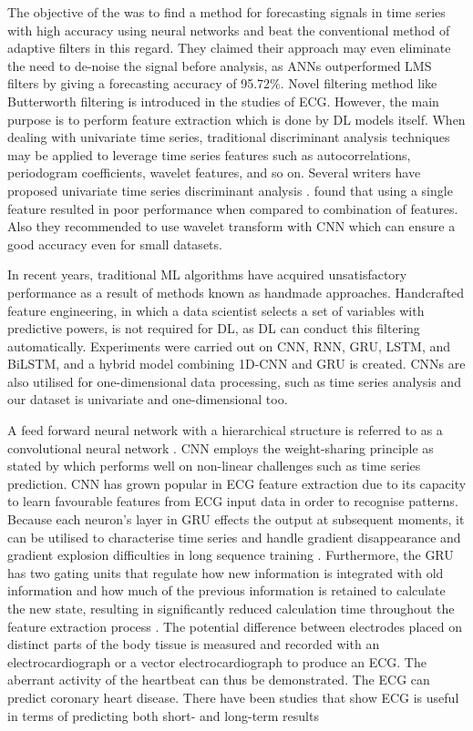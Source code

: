 \par The objective of the \cite{prakarsha2022time} was to find a method for forecasting signals in time series with high accuracy using neural networks and beat the conventional method of adaptive filters in this regard. They claimed their approach may even eliminate the need to de-noise the signal before analysis,  as ANNs outperformed LMS filters by giving a forecasting accuracy of 95.72\%. Novel filtering method like Butterworth filtering is introduced in the studies of ECG. However,  the main purpose is to perform feature extraction which is done by DL models itself. When dealing with univariate time series,  traditional discriminant analysis techniques may be applied to leverage time series features such as autocorrelations,  periodogram coefficients,  wavelet features,  and so on. Several writers have proposed univariate time series discriminant analysis \cite{maharaj2007discrimination}. \cite{hammad2021automated} found that using a single feature resulted in poor performance when compared to combination of features. Also they recommended to use wavelet transform with CNN which can ensure a good accuracy even for small datasets. 
\par In recent years,  traditional ML algorithms have acquired unsatisfactory performance as a result of methods known as handmade approaches. Handcrafted feature engineering, in which a data scientist selects a set of variables with predictive powers,  is not required for DL,  as DL can conduct this filtering automatically. Experiments were carried out on CNN,  RNN,  GRU,  LSTM,  and BiLSTM, and a hybrid model combining 1D-CNN and GRU is created. CNNs are also utilised for one-dimensional data processing,  such as time series analysis \cite{sajjad2020novel} and our dataset is univariate and one-dimensional too. \par A feed forward neural network with a hierarchical structure is referred to as a convolutional neural network \cite{chua1998cnn}. CNN employs the weight-sharing principle as stated by \cite{qiu2018variety} which performs well on non-linear challenges such as time series prediction. CNN has grown popular in ECG feature extraction due to its capacity to learn favourable features from ECG input data in order to recognise patterns\cite{wang2023inter}. Because each neuron's layer in GRU effects the output at subsequent moments,  it can be utilised to characterise time series and handle gradient disappearance and gradient explosion difficulties in long sequence training \cite{dey2017gate}. Furthermore,  the GRU has two gating units that regulate how new information is integrated with old information and how much of the previous information is retained to calculate the new state,  resulting in significantly reduced calculation time throughout the feature extraction process \cite{yao2021interpretation}. The potential difference between electrodes placed on distinct parts of the body tissue is measured and recorded with an electrocardiograph or a vector electrocardiograph to produce an ECG. The aberrant activity of the heartbeat can thus be demonstrated\cite{liu2021deep}. The ECG can predict coronary heart disease. There have been studies that show ECG is useful in terms of predicting both short- and long-term results
